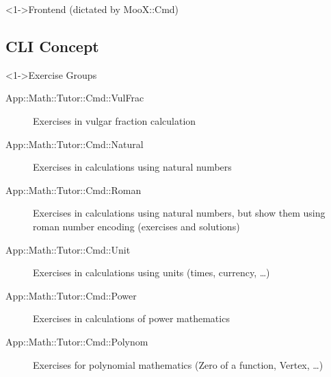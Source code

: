 \documentclass[ngerman,xcolor={table,dvipsnames},smaller,compress,hyperref={bookmarks,colorlinks}]{beamer}
\begin{document}
\begin{frame}[t,fragile]

\begin{block}<1->{Frontend (dictated by MooX::Cmd)}
\scriptsize
\def\psedge#1#2{\ncdiagg[nodesep=3pt,angleA=180,armA=0]{#2}{#1}}

\end{block}

\end{frame}

\subsection{CLI Concept}

\begin{frame}[t,fragile]

\begin{block}<1->{Exercise Groups}
\begin{description}
\item[App::Math::Tutor::Cmd::VulFrac] Exercises in vulgar fraction calculation
\item[App::Math::Tutor::Cmd::Natural] Exercises in calculations using natural numbers
\item[App::Math::Tutor::Cmd::Roman] Exercises in calculations using natural numbers, but show them using roman number encoding (exercises and solutions)
\item[App::Math::Tutor::Cmd::Unit] Exercises in calculations using units (times, currency, \ldots)
\item[App::Math::Tutor::Cmd::Power] Exercises in calculations of power mathematics
\item[App::Math::Tutor::Cmd::Polynom] Exercises for polynomial mathematics (Zero of a function, Vertex, \ldots)
\end{description}
\end{block}

\end{frame}
\end{document}
